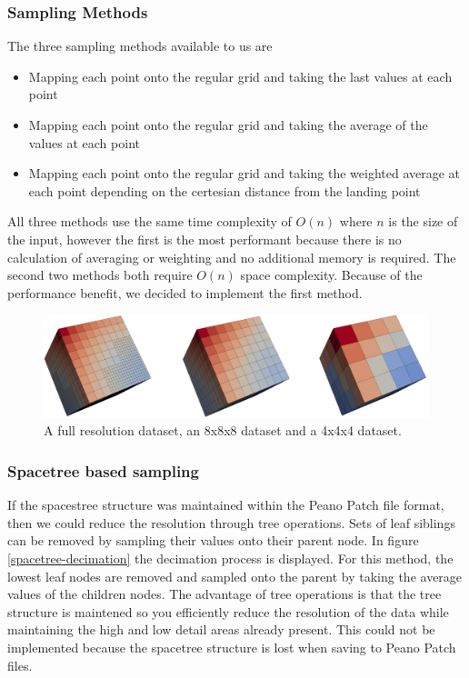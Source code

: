 \documentclass[12pt,a4paper]{article}
\begin{document}
\subsubsection{Sampling Methods}
The three sampling methods available to us are

\begin{itemize}
\item Mapping each point onto the regular grid and taking the last values at each point
\item Mapping each point onto the regular grid and taking the average of the values at each point
\item Mapping each point onto the regular grid and taking the weighted average at each point depending on the certesian distance from the landing point
\end{itemize}

All three methods use the same time complexity of $O(n)$ where $n$ is the size of the input, however the first is the most performant because there is no calculation of averaging or weighting and no additional memory is required. The second two methods both require $O(n)$ space complexity. Because of the performance benefit, we decided to implement the first method.

\begin{figure}[h]
\centering
\includegraphics[scale=0.15]{three-cubes}
\caption{A full resolution dataset, an 8x8x8 dataset and a 4x4x4 dataset.}
\label{three-cubes}
\end{figure}

\subsubsection{Spacetree based sampling}

If the spacestree structure was maintained within the Peano Patch file format, then we could reduce the resolution through tree operations. Sets of leaf siblings can be removed by sampling their values onto their parent node. In figure \ref{spacetree-decimation} the decimation process is displayed. For this method, the lowest leaf nodes are removed and sampled onto the parent by taking the average values of the children nodes. The advantage of tree operations is that the tree structure is maintened so you efficiently reduce the resolution of the data while maintaining the high and low detail areas already present. This could not be implemented because the spacetree structure is lost when saving to Peano Patch files.
\end{document}
